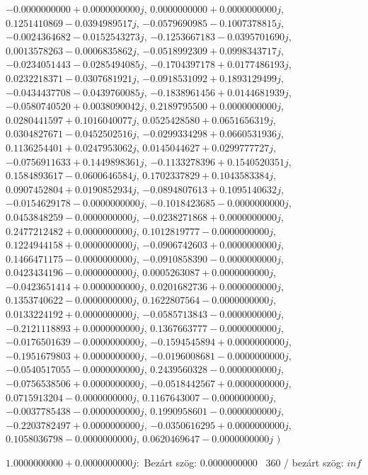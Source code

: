 \documentclass[14pt,a4paper]{article}
\begin{document}
\begin{itemize}
$-0.0000000000+0.0000000000j$, $0.0000000000+0.0000000000j$, $0.1251410869-0.0394989517j$, $-0.0579690985-0.1007378815j$, $-0.0024364682-0.0152543273j$, $-0.1253667183-0.0395701690j$, $0.0013578263-0.0006835862j$, $-0.0518992309+0.0998343717j$, $-0.0234051443-0.0285494085j$, $-0.1704397178+0.0177486193j$, $0.0232218371-0.0307681921j$, $-0.0918531092+0.1893129499j$, $-0.0434437708-0.0439760085j$, $-0.1838961456+0.0144681939j$, $-0.0580740520+0.0038090042j$, $0.2189795500+0.0000000000j$, $0.0280441597+0.1016040077j$, $0.0525428580+0.0651656319j$, $0.0304827671-0.0452502516j$, $-0.0299334298+0.0660531936j$, $0.1136254401+0.0247953062j$, $0.0145044627+0.0299777727j$, $-0.0756911633+0.1449898361j$, $-0.1133278396+0.1540520351j$, $0.1584893617-0.0600646584j$, $0.1702337829+0.1043583384j$, $0.0907452804+0.0190852934j$, $-0.0894807613+0.1095140632j$, $-0.0154629178-0.0000000000j$, $-0.1018423685-0.0000000000j$, $0.0453848259-0.0000000000j$, $-0.0238271868+0.0000000000j$, $0.2477212482+0.0000000000j$, $0.1012819777-0.0000000000j$, $0.1224944158+0.0000000000j$, $-0.0906742603+0.0000000000j$, $0.1466471175-0.0000000000j$, $-0.0910858390-0.0000000000j$, $0.0423434196-0.0000000000j$, $0.0005263087+0.0000000000j$, $-0.0423651414+0.0000000000j$, $0.0201682736+0.0000000000j$, $0.1353740622-0.0000000000j$, $0.1622807564-0.0000000000j$, $0.0133224192+0.0000000000j$, $-0.0585713843-0.0000000000j$, $-0.2121118893+0.0000000000j$, $0.1367663777-0.0000000000j$, $-0.0176501639-0.0000000000j$, $-0.1594545894+0.0000000000j$, $-0.1951679803+0.0000000000j$, $-0.0196008681-0.0000000000j$, $-0.0540517055-0.0000000000j$, $0.2439560328-0.0000000000j$, $-0.0756538506+0.0000000000j$, $-0.0518442567+0.0000000000j$, $0.0715913204-0.0000000000j$, $0.1167643007-0.0000000000j$, $-0.0037785438-0.0000000000j$, $0.1990958601-0.0000000000j$, $-0.2203782497+0.0000000000j$, $-0.0350616295+0.0000000000j$, $0.1058036798-0.0000000000j$, $0.0620469647-0.0000000000j$
$\big)$
\end{itemize}
$1.0000000000+0.0000000000j$:\
Bezárt szög: $0.0000000000$ \
360 / bezárt szög: $inf$\
\end{document}
